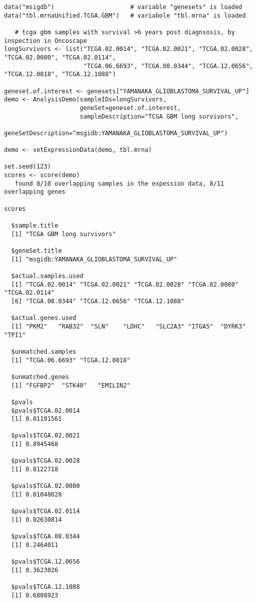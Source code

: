 \documentclass{article}
\begin{document}
\begin{verbatim}
data("msigdb")                     # variable "genesets" is loaded
data("tbl.mrnaUnified.TCGA.GBM")   # variabole "tbl.mrna" is loaded

   # tcga gbm samples with survival >6 years post diagnsosis, by inspection in Oncoscape
longSurvivors <- list("TCGA.02.0014", "TCGA.02.0021", "TCGA.02.0028", "TCGA.02.0080", "TCGA.02.0114",
                      "TCGA.06.6693", "TCGA.08.0344", "TCGA.12.0656", "TCGA.12.0818", "TCGA.12.1088")

geneset.of.interest <- genesets["YAMANAKA_GLIOBLASTOMA_SURVIVAL_UP"]
demo <- AnalysisDemo(sampleIDs=longSurvivors, 
                     geneSet=geneset.of.interest,
                     sampleDescription="TCGA GBM long survivors",
                     geneSetDescription="msgidb:YAMANAKA_GLIOBLASTOMA_SURVIVAL_UP")
   
demo <- setExpressionData(demo, tbl.mrna)

set.seed(123)
scores <- score(demo)
   found 8/10 overlapping samples in the expession data, 8/11 overlapping genes

scores

  $sample.title
  [1] "TCGA GBM long survivors"
  
  $geneSet.title
  [1] "msgidb:YAMANAKA_GLIOBLASTOMA_SURVIVAL_UP"
  
  $actual.samples.used
  [1] "TCGA.02.0014" "TCGA.02.0021" "TCGA.02.0028" "TCGA.02.0080" "TCGA.02.0114" 
  [6] "TCGA.08.0344" "TCGA.12.0656" "TCGA.12.1088"
  
  $actual.genes.used
  [1] "PKM2"   "RAB32"  "SLN"    "LDHC"   "SLC2A3" "ITGA5"  "DYRK3"  "TPI1"  
  
  $unmatched.samples
  [1] "TCGA.06.6693" "TCGA.12.0818"
  
  $unmatched.genes
  [1] "FGFBP2"  "STK40"   "EMILIN2"
  
  $pvals
  $pvals$TCGA.02.0014
  [1] 0.01191561
  
  $pvals$TCGA.02.0021
  [1] 0.8945468
  
  $pvals$TCGA.02.0028
  [1] 0.8122718
  
  $pvals$TCGA.02.0080
  [1] 0.01048628
  
  $pvals$TCGA.02.0114
  [1] 0.02630814
  
  $pvals$TCGA.08.0344
  [1] 0.2464011
  
  $pvals$TCGA.12.0656
  [1] 0.3623026
  
  $pvals$TCGA.12.1088
  [1] 0.6808923



\end{verbatim}
\end{document}
